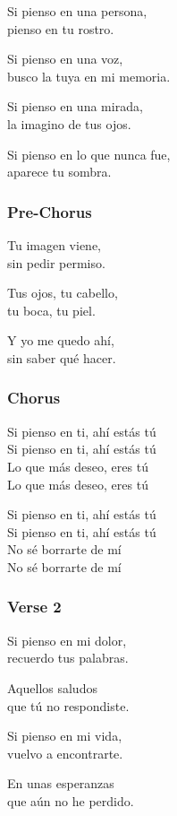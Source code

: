 \documentclass[]{article}
\begin{document}
Si pienso en una persona,\\
pienso en tu rostro.

Si pienso en una voz,\\
busco la tuya en mi memoria.

Si pienso en una mirada,\\
la imagino de tus ojos.

Si pienso en lo que nunca fue,\\
aparece tu sombra.

\subsubsection{Pre-Chorus}\label{pre-chorus-30}

Tu imagen viene,\\
sin pedir permiso.

Tus ojos, tu cabello,\\
tu boca, tu piel.

Y yo me quedo ahí,\\
sin saber qué hacer.

\subsubsection{Chorus}\label{chorus-47}

Si pienso en ti, ahí estás tú\\
Si pienso en ti, ahí estás tú\\
Lo que más deseo, eres tú\\
Lo que más deseo, eres tú

Si pienso en ti, ahí estás tú\\
Si pienso en ti, ahí estás tú\\
No sé borrarte de mí\\
No sé borrarte de mí

\subsubsection{Verse 2}\label{verse-2-15}

Si pienso en mi dolor,\\
recuerdo tus palabras.

Aquellos saludos\\
que tú no respondiste.

Si pienso en mi vida,\\
vuelvo a encontrarte.

En unas esperanzas\\
que aún no he perdido.
\end{document}
